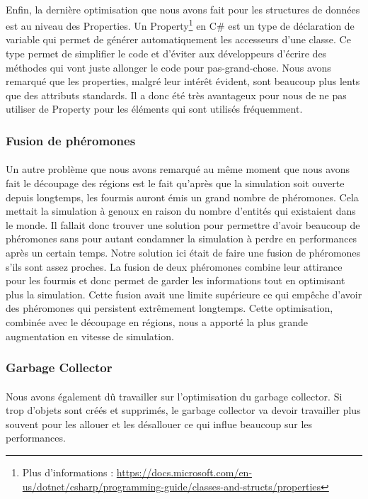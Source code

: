 \documentclass{EPUProjetDi}
\begin{document}
\paragraph{}
Enfin, la dernière optimisation que nous avons fait pour les structures de données est au niveau des Properties.
Un Property\footnote{Plus d'informations : \url{https://docs.microsoft.com/en-us/dotnet/csharp/programming-guide/classes-and-structs/properties}}
en C\# est un type de déclaration de variable qui permet de générer automatiquement les accesseurs d'une classe.
Ce type permet de simplifier le code et d'éviter aux développeurs d'écrire des méthodes qui vont juste allonger le code pour pas-grand-chose.
Nous avons remarqué que les properties, malgré leur intérêt évident, sont beaucoup plus lents que des attributs standards. 
Il a donc été très avantageux pour nous de ne pas utiliser de Property pour les éléments qui sont utilisés fréquemment.

\subsubsection{Fusion de phéromones}
\paragraph{}
Un autre problème que nous avons remarqué au même moment que nous avons fait le découpage des régions est le fait qu'après que la simulation soit ouverte depuis longtemps, les fourmis
auront émis un grand nombre de phéromones. Cela mettait la simulation à genoux en raison du nombre d'entités qui existaient dans le monde. Il fallait donc trouver une solution pour permettre
d'avoir beaucoup de phéromones sans pour autant condamner la simulation à perdre en performances après un certain temps.
Notre solution ici était de faire une fusion de phéromones s'ils sont assez proches. La fusion de deux phéromones combine leur attirance pour les fourmis et donc permet de garder les informations
tout en optimisant plus la simulation. Cette fusion avait une limite supérieure ce qui empêche d'avoir des phéromones qui persistent extrêmement longtemps.
Cette optimisation, combinée avec le découpage en régions, nous a apporté la plus grande augmentation en vitesse de simulation.

\subsubsection{Garbage Collector}
\paragraph{}
Nous avons également dû travailler sur l'optimisation du garbage collector. Si trop d'objets sont créés et supprimés, le garbage collector va devoir travailler plus souvent pour les allouer et les désallouer
ce qui influe beaucoup sur les performances.  
\end{document}

